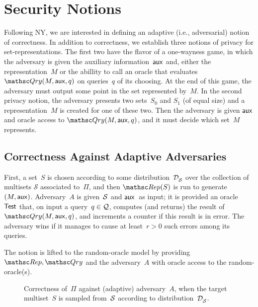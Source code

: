 \section{Security Notions}
\label{sec:security-notions}
Following NY, we are interested in defining an adaptive (i.e.,
adversarial) notion of correctness.   
In addition to correctness, we establish three notions of privacy for
set-representations. The first two have the flavor of a one-wayness game, in which the adversary is given the auxiliary information~${\sf aux}$ and, either the representation~$M$ or the abillity to call an oracle that evaluates $\Qry(M,\aux,q)$ on queries~$q$ of its choosing.  At the end of this game, the adversary must output some point in the set represented by~$M$.  In the second privacy notion, the adversary presents two sets~$S_0$ and $S_1$ (of equal size) and a representation~$M$ is created for one of these two. Then the adversary is given ${\sf aux}$ and oracle access to $\Qry(M,\aux,q)$, and it must decide which set~$M$ represents.

\subsection{Correctness Against Adaptive Adversaries}

First, a set~$S$ is chosen according to some
distribution~$\mathcal{D}_{{\cal S}}^{}$ over the collection of multisets
$\mathcal{S}$ associated to~$\Pi$, and then
$\Rep(S)$ is run to generate $(M,{\sf aux})$.
Adversary~$A$ is given~${\cal S}$ and ${\sf aux}$~as input; it is
provided an oracle~$\mathsf{Test}$ that, on input a query~$q \in {\cal Q}$,
computes (and returns) the result of $\Qry(M,\aux,q)$, and increments
a counter if this result is in error.  The adversary wins if it
manages to cause at least~$r>0$ such errors among its queries.

The notion is lifted to the random-oracle model by providing
$\Rep,\Qry$ and the adversary~$A$ with oracle access to the
random-oracle(s).



\begin{figure}[htp]
\centering
{}
\caption{Correctness of~$\Pi$ against (adaptive) adversary~$A$, when
  the target multiset~$S$ is sampled from~${\cal S}$ according to distribution~$\mathcal{D}_{{\cal S}}^{}$.} 
\label{fig:correctness}
\end{figure}

